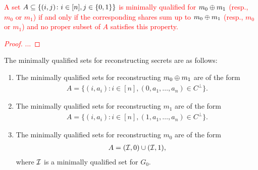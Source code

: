 \textcolor{red}{
\begin{myclaim}\label{clm:min-secret}
	A set $A \subseteq \{(i,j)\colon i \in [n], j \in {\{0,1\}} \}$ is minimally qualified for $m_0\oplus m_1$ (resp., $m_0$ or $m_1$) if and only if the corresponding shares sum up to $m_0\oplus m_1$ (resp., $m_0$ or $m_1$) and no proper subset of $A$ satisfies this property.
\end{myclaim}
\begin{proof}
	...
\end{proof}
}

\begin{lemma}\label{lem:min-qual-secret}
	The minimally qualified sets for reconstructing secrets are as follows:
	\begin{enumerate}
		\item The minimally qualified sets for reconstructing $m_0\oplus m_1$ are of the form
		\begin{align*}
			A = \{ (i,a_i)\colon i \in [n], (0,a_1,\dotsc, a_n) \in C^\perp \}.
		\end{align*}
		\item The minimally qualified sets for reconstructing $m_1$ are of the form
		\begin{align*}
			A = \{ (i,a_i)\colon i \in [n], (1,a_1,\dotsc, a_n) \in C^\perp \}.
		\end{align*}
		\item The minimally qualified sets for reconstructing $m_0$ are of the form
		\begin{align*}
			A = ({\mathcal I},0) \cup ({\mathcal I}, 1),
		\end{align*}
		where ${\mathcal I}$ is a minimally qualified set for $G_0$.
	\end{enumerate}
\end{lemma}
